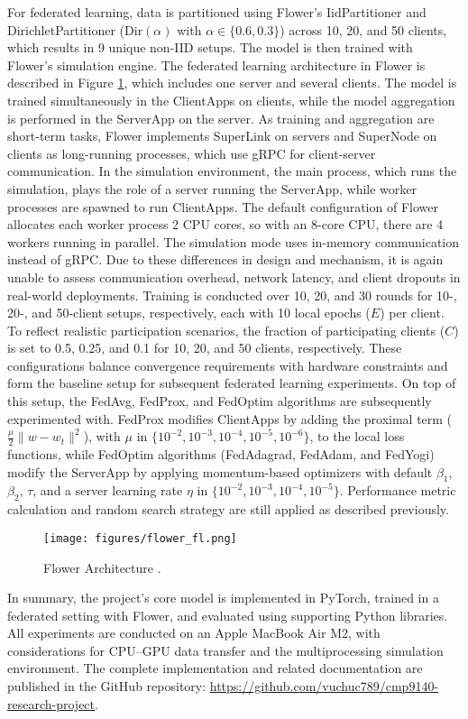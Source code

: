 For federated learning, data is partitioned using Flower's IidPartitioner and DirichletPartitioner ($\text{Dir}(\alpha)$ with $\alpha \in \{0.6, 0.3\}$) across 10, 20, and 50 clients, which results in 9 unique non-IID setups. The model is then trained with Flower's simulation engine. The federated learning architecture in Flower is described in Figure \ref{fig:flower_fl}, which includes one server and several clients. The model is trained simultaneously in the ClientApps on clients, while the model aggregation is performed in the ServerApp on the server. As training and aggregation are short-term tasks, Flower implements SuperLink on servers and SuperNode on clients as long-running processes, which use gRPC for client-server communication. In the simulation environment, the main process, which runs the simulation, plays the role of a server running the ServerApp, while worker processes are spawned to run ClientApps. The default configuration of Flower allocates each worker process 2 CPU cores, so with an 8-core CPU, there are 4 workers running in parallel. The simulation mode uses in-memory communication instead of gRPC. Due to these differences in design and mechanism, it is again unable to assess communication overhead, network latency, and client dropouts in real-world deployments. Training is conducted over 10, 20, and 30 rounds for 10-, 20-, and 50-client setups, respectively, each with 10 local epochs ($E$) per client. To reflect realistic participation scenarios, the fraction of participating clients ($C$) is set to 0.5, 0.25, and 0.1 for 10, 20, and 50 clients, respectively. These configurations balance convergence requirements with hardware constraints and form the baseline setup for subsequent federated learning experiments. On top of this setup, the FedAvg, FedProx, and FedOptim algorithms are subsequently experimented with. FedProx modifies ClientApps by adding the proximal term ($\frac{\mu}{2} \lVert w - w_t \rVert^{2}$), with $\mu$ in $\{10^{-2}, 10^{-3}, 10^{-4}, 10^{-5}, 10^{-6}\}$, to the local loss functions, while FedOptim algorithms (FedAdagrad, FedAdam, and FedYogi) modify the ServerApp by applying momentum-based optimizers with default $\beta_1$, $\beta_2$, $\tau$, and a server learning rate $\eta$ in $\{10^{-2}, 10^{-3}, 10^{-4}, 10^{-5}\}$. Performance metric calculation and random search strategy are still applied as described previously.

\begin{figure}[h]
    \centering
    \texttt{[image: figures/flower\_fl.png]}
    \caption{Flower Architecture \citep{flower-architecture}.}
    \label{fig:flower_fl}
\end{figure}

In summary, the project’s core model is implemented in PyTorch, trained in a federated setting with Flower, and evaluated using supporting Python libraries. All experiments are conducted on an Apple MacBook Air M2, with considerations for CPU–GPU data transfer and the multiprocessing simulation environment. The complete implementation and related documentation are published in the GitHub repository: \url{https://github.com/vuchuc789/cmp9140-research-project}.
